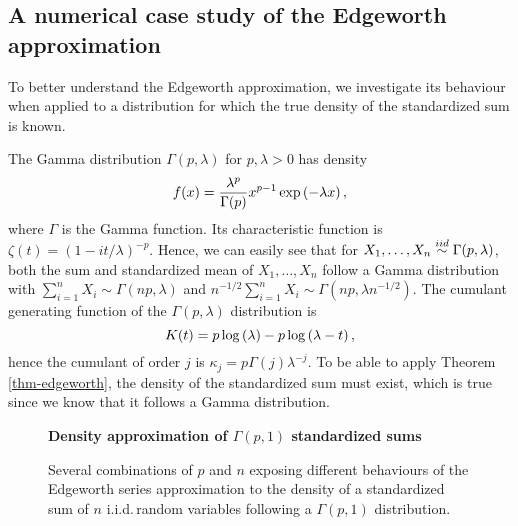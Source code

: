 \subsection{A numerical case study of the Edgeworth approximation}

To better understand the Edgeworth approximation, we investigate its behaviour when applied to a distribution for which the true density of the standardized sum is known.

\begin{example} \label{ex-gamma-edge}
    The Gamma distribution $\Gamma(p, \lambda)$ for $p, \lambda > 0$ has density
    \begin{equation*}
        f(x) = \frac{\lambda^p}{\Gamma(p)} x^{p-1} \exp\left(-\lambda x\right),
    \end{equation*}
    where $\Gamma$ is the Gamma function. Its characteristic function is $\zeta(t) = (1 - it/\lambda)^{-p}$. Hence, we can easily see that for $X_1, \ldots, X_n \stackrel{iid}{\sim} \Gamma(p, \lambda)$, both the sum and standardized mean of $X_1, \ldots, X_n$ follow a Gamma distribution with $\sum_{i=1}^n X_i \sim \Gamma(np, \lambda)$ and $n^{-1/2} \sum_{i=1}^n X_i \sim \Gamma(np, \lambda n^{-1/2})$. The cumulant generating function of the $\Gamma(p, \lambda)$ distribution is
    \begin{equation*}
        K(t) = p \log\left(\lambda\right) - p\log\left(\lambda - t\right),
    \end{equation*}
    hence the cumulant of order $j$ is $\kappa_j = p\Gamma(j)\lambda^{-j}$. To be able to apply Theorem \ref{thm-edgeworth}, the density of the standardized sum must exist, which is true since we know that it follows a Gamma distribution.
    

    \begin{figure}[!htbp]
        \textbf{Density approximation of $\Gamma(p,1)$ standardized sums}
        \centering
        \qquad
        \caption{Several combinations of $p$ and $n$ exposing different behaviours of the Edgeworth series approximation to the density of a standardized sum  of $n$ i.i.d.\,random variables following a $\Gamma(p, 1)$ distribution.}
        \label{fig-edgeworth}
    \end{figure}


\end{example}
